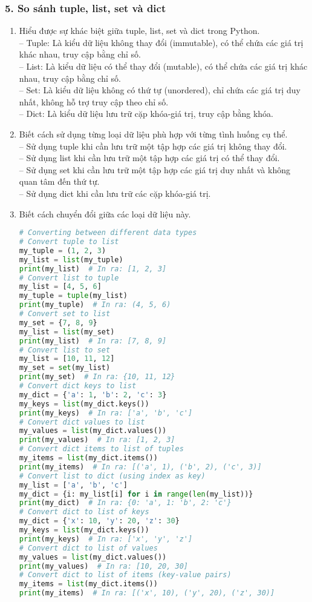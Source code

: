 \subsubsection*{5. So sánh tuple, list, set và dict}
\begin{enumerate}[label=\alph*.]
    \item Hiểu được sự khác biệt giữa tuple, list, set và dict trong Python.\\
    -- Tuple: Là kiểu dữ liệu không thay đổi (immutable), có thể chứa các giá trị khác nhau, truy cập bằng chỉ số.\\
    -- List: Là kiểu dữ liệu có thể thay đổi (mutable), có thể chứa các giá trị khác nhau, truy cập bằng chỉ số.\\
    -- Set: Là kiểu dữ liệu không có thứ tự (unordered), chỉ chứa các giá trị duy nhất, không hỗ trợ truy cập theo chỉ số.\\
    -- Dict: Là kiểu dữ liệu lưu trữ cặp khóa-giá trị, truy cập bằng khóa.
    \item Biết cách sử dụng từng loại dữ liệu phù hợp với từng tình huống cụ thể.\\
    -- Sử dụng tuple khi cần lưu trữ một tập hợp các giá trị không thay đổi.\\
    -- Sử dụng list khi cần lưu trữ một tập hợp các giá trị có thể thay đổi.\\
    -- Sử dụng set khi cần lưu trữ một tập hợp các giá trị duy nhất và không quan tâm đến thứ tự.\\
    -- Sử dụng dict khi cần lưu trữ các cặp khóa-giá trị.
    \item Biết cách chuyển đổi giữa các loại dữ liệu này.
    \begin{lstlisting}[language=Python]
# Converting between different data types
# Convert tuple to list
my_tuple = (1, 2, 3)
my_list = list(my_tuple)
print(my_list)  # In ra: [1, 2, 3]
# Convert list to tuple
my_list = [4, 5, 6]
my_tuple = tuple(my_list)
print(my_tuple)  # In ra: (4, 5, 6)
# Convert set to list
my_set = {7, 8, 9}
my_list = list(my_set)
print(my_list)  # In ra: [7, 8, 9]
# Convert list to set
my_list = [10, 11, 12]
my_set = set(my_list)
print(my_set)  # In ra: {10, 11, 12}
# Convert dict keys to list
my_dict = {'a': 1, 'b': 2, 'c': 3}
my_keys = list(my_dict.keys())
print(my_keys)  # In ra: ['a', 'b', 'c']
# Convert dict values to list
my_values = list(my_dict.values())
print(my_values)  # In ra: [1, 2, 3]
# Convert dict items to list of tuples
my_items = list(my_dict.items())
print(my_items)  # In ra: [('a', 1), ('b', 2), ('c', 3)]
# Convert list to dict (using index as key)
my_list = ['a', 'b', 'c']
my_dict = {i: my_list[i] for i in range(len(my_list))}
print(my_dict)  # In ra: {0: 'a', 1: 'b', 2: 'c'}
# Convert dict to list of keys
my_dict = {'x': 10, 'y': 20, 'z': 30}
my_keys = list(my_dict.keys())
print(my_keys)  # In ra: ['x', 'y', 'z']
# Convert dict to list of values
my_values = list(my_dict.values())
print(my_values)  # In ra: [10, 20, 30]
# Convert dict to list of items (key-value pairs)
my_items = list(my_dict.items())
print(my_items)  # In ra: [('x', 10), ('y', 20), ('z', 30)]
    \end{lstlisting}
\end{enumerate}
\vspace*{-6.5em}
